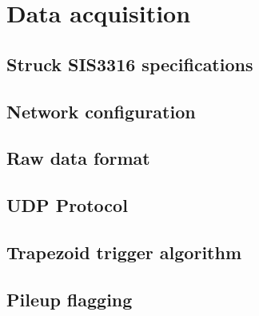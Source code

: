 
\section{Data acquisition}




\subsection{Struck SIS3316 specifications}


\cite{sis3316_manual, sis3316_udp_addendum}


\subsection{Network configuration}



\subsection{Raw data format}



\subsection{UDP Protocol}



\subsection{Trapezoid trigger algorithm}



\subsection{Pileup flagging}

